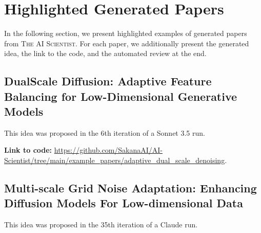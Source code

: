 \documentclass[11pt, a4paper]{include/gdm_format}
\newcommand{\ouralgo}{\textsc{The AI Scientist}\xspace}
\begin{document}



\clearpage
\section{Highlighted Generated Papers}
\label{appsec:gen_papers}
In the following section, we present highlighted examples of generated papers from \ouralgo.
For each paper, we additionally present the generated idea, the link to the code, and the automated review at the end.

%
\subsection{DualScale Diffusion: Adaptive Feature Balancing for Low-Dimensional Generative\\ Models}
This idea was proposed in the 6th iteration of a Sonnet 3.5 run.

\begin{tcolorbox}[colback=blue!5!white, colframe=blue!75!black, title=Idea]
{\small  }
\end{tcolorbox}

\textbf{Link to code:} \url{https://github.com/SakanaAI/AI-Scientist/tree/main/example_papers/adaptive_dual_scale_denoising}.


\label{paper:adaptive_dual_scale_denoising}

\begin{tcolorbox}[colback=green!5!white, colframe=green!75!black, title=Review, breakable]
{\small  }
\end{tcolorbox}

\clearpage
%
\subsection{Multi-scale Grid Noise Adaptation: Enhancing Diffusion Models For Low-dimensional Data}

This idea was proposed in the 35th iteration of a Claude run.

\begin{tcolorbox}[colback=blue!5!white, colframe=blue!75!black, title=Idea]
{\small  }
\end{tcolorbox}
\end{document}
